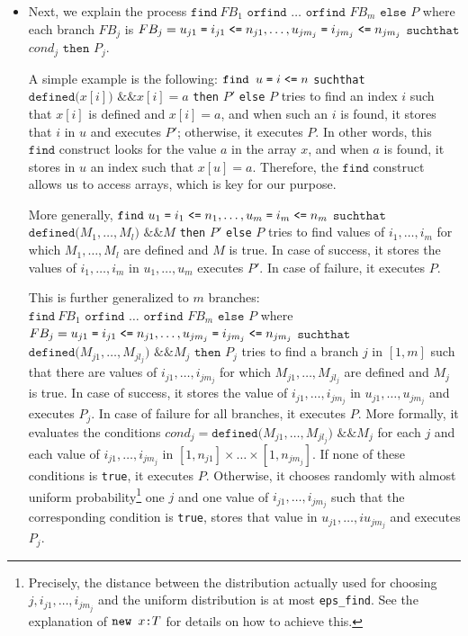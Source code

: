 \begin{itemize}
\item 
Next, we explain the process 
$\texttt{find}\ FB_1 \texttt{ orfind }\ldots\texttt{ orfind }FB_m \texttt{ else } P$ where each branch $FB_j$ is $FB_j = u_{j1} \mathrel{\texttt{=}}  i_{j1} \mathrel{\texttt{<=}}  n_{j1}, \ldots, u_{jm_j} \mathrel{\texttt{=}}  i_{jm_j} \mathrel{\texttt{<=}}  n_{jm_j}$ $\texttt{suchthat}$ $cond_j$ $\texttt{then}$ $P_j$.

A simple example is the following:
$\texttt{find }u \mathrel{\texttt{=}}  i \mathrel{\texttt{<=}}  n$ \texttt{suchthat} $\texttt{defined(}x[i]\texttt{) \&\& }x[i] = a$ \texttt{then} $P'$ \texttt{else} $P$
tries to find an index $i$ such that $x[i]$ is defined and
$x[i] = a$, and when such an $i$ is found,
it stores that $i$ in $u$ and executes $P'$;
otherwise, it executes $P$.
In other words, this $\texttt{find}$ construct looks for the value
$a$ in the array $x$, and when $a$ is found, it stores in
$u$ an index such that $x[u] = a$. Therefore, the $\texttt{find}$ construct
allows us to access arrays, which is key for our purpose.

More generally, $\texttt{find}\ u_{1} \mathrel{\texttt{=}}  i_1 \mathrel{\texttt{<=}}  n_{1}, \ldots, u_{m} \mathrel{\texttt{=}}  i_m \mathrel{\texttt{<=}}  n_{m}$ $\texttt{suchthat}$ $\texttt{defined(}M_{1}, \ldots, M_{l}\texttt{) \&\& } M$ \texttt{then} $P'$ \texttt{else} $P$ tries to find values of $i_1, \ldots, i_m$ for which
$M_1, \ldots, M_l$ are defined and $M$ is true. In case of success, it
stores the values of $i_1, \ldots, i_m$ in $u_1, \ldots, u_m$
executes $P'$. In case of failure, it executes $P$.

This is further generalized to $m$ branches: 
$\texttt{find}\ FB_1 \texttt{ orfind }\ldots\texttt{ orfind }FB_m \texttt{ else } P$
where $FB_j = u_{j1} \mathrel{\texttt{=}}  i_{j1} \mathrel{\texttt{<=}}  n_{j1}, \ldots, u_{jm_j} \mathrel{\texttt{=}}  i_{jm_j} \mathrel{\texttt{<=}}  n_{jm_j}$ $\texttt{suchthat}$ $\texttt{defined(}M_{j1}, \ldots, M_{jl_j}\texttt{) \&\& }M_j$ $\texttt{then}$ $P_j$
tries to find a branch $j$ in $[1,m]$ such that there are 
values of $i_{j1}, \ldots, i_{jm_j}$ for which 
$M_{j1}, \ldots, M_{jl_j}$ are defined and $M_j$ is true. In case of 
success, it stores the value of $i_{j1}, \ldots, i_{jm_j}$ in $u_{j1}, \ldots, u_{jm_j}$ and executes $P_j$.
In case of failure for all branches, it executes $P$. 
More formally, it evaluates the conditions
$cond_j = \texttt{defined(}M_{j1}, \ldots, M_{jl_j}\texttt{) \&\& }M_j$ for each $j$ and
each value of $i_{j1}, \ldots, i_{jm_j}$ in $[1, n_{j1}] 
\times \ldots \times [1, n_{jm_j}]$.
If none of these conditions is \texttt{true}, it executes $P$.
Otherwise, it chooses randomly with almost uniform 
probability\footnote{Precisely, the distance between the distribution actually
used for choosing $j, i_{j1}, \ldots, i_{jm_j}$ and the uniform
distribution is at most \texttt{eps\_find}. See the explanation of $\texttt{new\ }{x}\texttt{:}{T}$
for details on how to achieve this.}
one $j$ and one value of $i_{j1}, \ldots, i_{jm_j}$
such that the corresponding condition is \texttt{true},
stores that value in $u_{j1}, \ldots, iu_{jm_j}$ and executes $P_j$.


\end{itemize}
